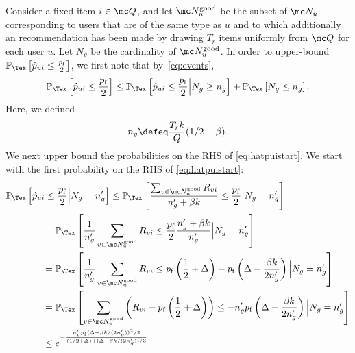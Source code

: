 \documentclass{article}
\newcommand\pf{p_{\mathrm{f}}}
\newcommand\ocrating{R}
\newcommand\ocR{R}
\newcommand{\setQ}{\mc Q}
\renewcommand\PR[2][\Tex]{
\ifthenelse{\equal{#1}{}}{{\mathbb P}\left[#2\right]}{\ensuremath{{\mathbb P}_{#1}\left[ #2\right]}}}
\begin{document}
Consider a fixed item $i \in \setQ$, and let $\mc N_u^{\text{good}}$ be the subset of $\mc N_u$ corresponding to users that are of the same type as $u$ and to which additionally an recommendation has been made by drawing $T_r$ items uniformly from $\setQ$ for each user $u$. 
Let $N_g$ be the cardinality of  $\mc N_u^{\text{good}}$. 
In order to upper-bound $\PR{\hat p_{ui} \leq \frac{\pf}{2} }$, we first note that by~\eqref{eq:events}, 
\begin{align}
\PR{\hat p_{ui} \leq \frac{\pf}{2} }
\leq  
\PR{\hat p_{ui} \leq \frac{\pf}{2} \Big| N_g \geq n_g }
+ \PR{N_g \leq n_g}.
\label{eq:hatpuistart}
\end{align}
Here, we defined 
\begin{align}
n_g \defeq \frac{T_r k}{Q} (1/2- \beta). 
\label{eq:choiceng}
\end{align}
We next upper bound the probabilities on the RHS of \eqref{eq:hatpuistart}. 
We start with the first probability on the RHS of \eqref{eq:hatpuistart}: 
\begin{align}
\PR{ \hat p_{ui} 
\leq \frac{\pf}{2} \Big| N_g =  n_g' }
%
\hspace{-2.5cm}&\hspace{2.5cm}\leq
\PR{ \frac{\sum_{v \in \mc N_u^{\text{good}} }  \ocR_{vi} }{ n_g' + \nb} \leq \frac{\pf}{2} \Big| N_g =  n_g'} \label{eq:NbNgpro} \\
%
&= 
\PR{ \frac{1}{n_g'}   \sum_{v \in \mc N_u^{\text{good}} }  \ocR_{vi}
 \leq \frac{\pf}{2} \frac{n'_g + \nb}{ n_g'}    \Big|  N_g = n_g'} \nonumber \\
&= 
\PR{ \frac{1}{n_g'}   \sum_{v \in \mc N_u^{\text{good} } } \ocR_{vi} 
 \leq  \pf\left(\frac{1}{2} + \Delta \right) -  \pf \left(\Delta - \frac{\nb}{2 n_g'} \right) 
 \Big|  N_g = n_g'
 } \nonumber \\
%
&=\PR{    \sum_{v \in \mc N_u^{\text{good} } }  
\left(\ocR_{vi} - \pf\left(\frac{1}{2} + \Delta \right)
\right)
 \leq   -  n_g' \pf \left(\Delta - \frac{\nb}{2 n_g'} \right) 
 \Big|  N_g = n_g'
 } \nonumber \\
&\leq  
%
%
e^{ -  \frac{  n_g' \pf  (\Delta - \nb/ (2n_g') )^2 / 2 }{  (1/2 + \Delta)  +  (\Delta - \nb/(2n_g'))/3  } }
\label{eq:boundNgNb}
\end{align}
\end{document}
